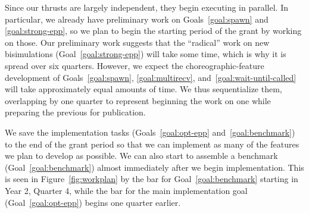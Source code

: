 Since our thrusts are largely independent, they begin executing in parallel.
In particular, we already have preliminary work on Goals~\ref{goal:spawn} and \ref{goal:strong-epp}, so we plan to begin the starting period of the grant by working on those.
Our preliminary work suggests that the ``radical'' work on new bisimulations (Goal~\ref{goal:strong-epp}) will take some time, which is why it is spread over six quarters.
However, we expect the choreographic-feature development of Goals~\ref{goal:spawn}, \ref{goal:multirecv}, and~\ref{goal:wait-until-called} will take approximately equal amounts of time.
We thus sequentialize them, overlapping by one quarter to represent beginning the work on one while preparing the previous for publication.

We save the implementation tasks (Goals~\ref{goal:opt-epp} and~\ref{goal:benchmark}) to the end of the grant period so that we can implement as many of the features we plan to develop as possible.
We can also start to assemble a benchmark (Goal~\ref{goal:benchmark}) almost immediately after we begin implementation.
This is seen in Figure~\ref{fig:workplan} by the bar for Goal~\ref{goal:benchmark} starting in Year 2, Quarter 4, while the bar for the main implementation goal (Goal~\ref{goal:opt-epp}) begins one quarter earlier.

